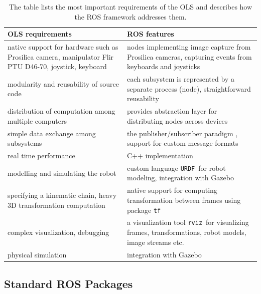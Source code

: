 {\renewcommand{\arraystretch}{1.5}
\begin{table}[htbp]
	\centering
	\caption{The table lists the most important requirements of the OLS and describes how the ROS framework addresses them.}
	\begin{tabularx}{0.99\textwidth}{XX}
		\toprule
		\textbf{OLS requirements} & \textbf{ROS features} \\
		\midrule
		native support for hardware such as Prosilica camera, manipulator Flir PTU D46-70, joystick, keyboard & nodes implementing image capture from Prosilica cameras, capturing events from keyboards and joysticks \\
		modularity and reusability of source code & each subsystem is represented by a separate process (node), straightforward reusability \\
		distribution of computation among multiple computers & provides abstraction layer for distributing nodes across devices \\
		simple data exchange among subsystems & the publisher/subscriber paradigm \cite{O'Kane201310}, support for custom message formats \\
		real time performance & C++ implementation \\
		modelling and simulating the robot & custom language \texttt{URDF}\footnotemark ~for robot modeling, integration with Gazebo \\
		specifying a kinematic chain, heavy 3D transformation computation & native support for computing transformation between frames using package \texttt{tf} \\
		complex visualization, debugging & a visualization tool \texttt{rviz}\footnotemark ~for visualizing frames, transformations, robot models, image streams etc. \\
		physical simulation & integration with Gazebo \\
		\bottomrule
	\end{tabularx}
	\label{tab:ols_requirements_ros_features}
\end{table}}


\subsection{Standard ROS Packages}

